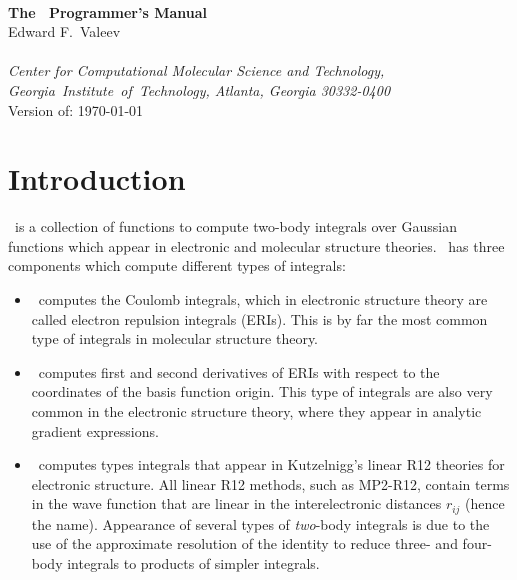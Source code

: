 \documentclass[12pt]{article}
\begin{document}


\begin{center}
\ \\
\vspace{2.0in}
{\bf {\Large The \LIBINT\ Programmer's Manual}} \\
\vspace{0.5in}
Edward F.\ Valeev \\
\ \\
{\em Center for Computational Molecular Science and Technology, \mbox{Georgia
Institute of Technology,} Atlanta, Georgia 30332-0400}
\ \\
\vspace{0.3in}
Version of: \today
\end{center}

\thispagestyle{empty}

\newpage
\section{Introduction}
\LIBINT\ is a collection of functions to compute two-body integrals over Gaussian
functions which appear in electronic and molecular structure theories.
\LIBINTv \cite{Libint1}\ has three components which compute different types of integrals:

\begin{itemize}

\item \libint\ computes the Coulomb integrals, which in electronic structure theory
are called electron repulsion integrals (ERIs). This is by far the most common type of
integrals in molecular structure theory.

\item \libderiv\ computes first and second derivatives of ERIs with respect to the
coordinates of the basis function origin. This type of integrals are also very common
in the electronic structure theory, where they appear in analytic gradient expressions.

\item \librij\ computes types integrals that appear in Kutzelnigg's linear R12 theories
for electronic structure.\cite{Kutzelnigg85,Kutzelnigg91} All linear R12 methods, such as
MP2-R12, contain terms in the wave function that are linear in the interelectronic distances
$r_{ij}$ (hence the name). Appearance of several types of {\em two}-body integrals
is due to the use of the approximate resolution of the identity to reduce three- and four-body
integrals to products of simpler integrals.

\end{itemize}
\end{document}
